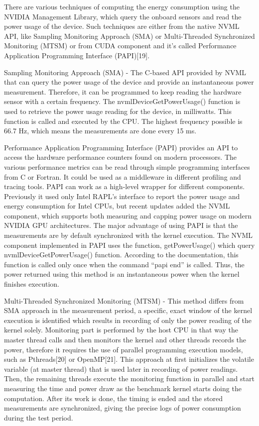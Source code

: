 There are various techniques of computing the energy consumption
using the NVIDIA Management Library, which query the onboard
sensors and read the power usage of the device. Such techniques
are either from the native NVML API, like Sampling Monitoring
Approach (SMA) or Multi-Threaded Synchronized Monitoring (MTSM)
or from CUDA component and it’s called Performance Application
Programming Interface (PAPI)[19].

Sampling Monitoring Approach (SMA) - The C-based API provided
by NVML that can query the power usage of the device and provide
an instantaneous power measurement. Therefore, it can be
programmed to keep reading the hardware sensor with a certain
frequency. The nvmlDeviceGetPowerUsage() function is used to
retrieve the power usage reading for the device, in milliwatts.
This function is called and executed by the CPU. The highest
frequency possible is 66.7 Hz, which means the measurements are
done every 15 ms.

Performance Application Programming Interface (PAPI) provides
an API to access the hardware performance counters found on
modern processors. The various performance metrics can be read
through simple programming interfaces from C or Fortran. It
could be used as a middleware in different profiling and tracing
tools. PAPI can work as a high-level wrapper for different
components. Previously it used only Intel RAPL's interface to
report the power usage and energy consumption for Intel CPUs,
but recent updates added the NVML component, which supports
both measuring and capping power usage on modern NVIDIA GPU
architectures. The major advantage of using PAPI is that the
measurements are by default synchronized with the kernel execution.
The NVML component implemented in PAPI uses the function,
getPowerUsage() which query nvmlDeviceGetPowerUsage() function.
According to the documentation, this function is called only
once when the command “papi end” is called. Thus, the power
returned using this method is an instantaneous power when the
kernel finishes execution.

Multi-Threaded Synchronized Monitoring (MTSM) - This method
differs from SMA approach in the measurement period, a specific,
exact window of the kernel execution is identified which results
in recording of only the power reading of the kernel solely.
Monitoring part is performed by the host CPU in that way the
master thread calls and then monitors the kernel and other
threads records the power, therefore it requires the use of
parallel programming execution models, such as Pthreads[20] or
OpenMP[21]. This approach at first initializes the volatile
variable (at master thread) that is used later in recording of
power readings. Then, the remaining threads execute the monitoring
function in parallel and start measuring the time and power draw
as the benchmark kernel starts doing the computation. After its
work is done, the timing is ended and the stored measurements
are synchronized, giving the precise logs of power consumption
during the test period.


